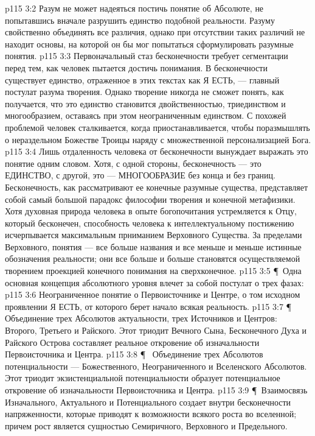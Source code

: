 \vs p115 3:2 Разум не может надеяться постичь понятие об Абсолюте, не попытавшись вначале разрушить единство подобной реальности. Разуму свойственно объединять все различия, однако при отсутствии таких различий не находит основы, на которой он бы мог попытаться сформулировать разумные понятия.
\vs p115 3:3 Первоначальный стаз бесконечности требует сегментации перед тем, как человек пытается достичь понимания. В бесконечности существует единство, отраженное в этих текстах как Я ЕСТЬ, --- главный постулат разума творения. Однако творение никогда не сможет понять, как получается, что это единство становится двойственностью, триединством и многообразием, оставаясь при этом неограниченным единством. С похожей проблемой человек сталкивается, когда приостанавливается, чтобы поразмышлять о нераздельном Божестве Троицы наряду с множественной персонализацией Бога.
\vs p115 3:4 Лишь отдаленность человека от бесконечности вынуждает выражать это понятие одним словом. Хотя, с одной стороны, бесконечность --- это ЕДИНСТВО, с другой, это --- МНОГООБРАЗИЕ без конца и без границ. Бесконечность, как рассматривают ее конечные разумные существа, представляет собой самый большой парадокс философии творения и конечной метафизики. Хотя духовная природа человека в опыте богопочитания устремляется к Отцу, который бесконечен, способность человека к интеллектуальному постижению исчерпывается максимальным прниманием Верховного Существа. За пределами Верховного, понятия --- все больше названия и все меньше и меньше истинные обозначения реальности; они все больше и больше становятся осуществляемой творением проекцией конечного понимания на сверхконечное.
\vs p115 3:5 \P\ Одна основная концепция абсолютного уровня влечет за собой постулат о трех фазах:
\vs p115 3:6 \bibnobreakspace {} Неограниченное понятие о Первоисточнике и Центре, о том исходном проявлении Я ЕСТЬ, от которого берет начало всякая реальность.
\vs p115 3:7 \P\ \bibnobreakspace {} Объединение трех Абсолютов актуальности, трех Источников и Центров: Второго, Третьего и Райского. Этот триодит Вечного Сына, Бесконечного Духа и Райского Острова составляет реальное откровение об изначальности Первоисточника и Центра.
\vs p115 3:8 \P\ \bibnobreakspace {} Объединение трех Абсолютов потенциальности --- Божественного, Неограниченного и Вселенского Абсолютов. Этот триодит экзистенциальной потенциальности образует потенциальное откровение об изначальности Первоисточника и Центра.
\vs p115 3:9 \P\ Взаимосвязь Изначального, Актуального и Потенциального создает внутри бесконечности напряженности, которые приводят к возможности всякого роста во вселенной; причем рост является сущностью Семиричного, Верховного и Предельного.
